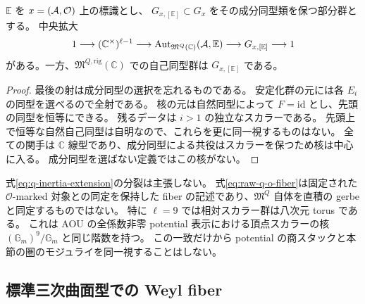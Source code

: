 \begin{proposition}[忘却に伴う慣性の核]\label{prop:q-marking-scalar-inertia}
$\mathbb E$ を $x=(\mathcal A,\mathcal O)$ 上の標識とし、
$G_{x,[\mathbb E]}\subset G_x$ をその成分同型類を保つ部分群とする。
中央拡大
\begin{equation}\label{eq:q-inertia-extension}
 1\longrightarrow (\mathbb C^\times)^{\ell-1}
 \longrightarrow\operatorname{Aut}_{\mathfrak M^Q(\mathbb C)}(\mathcal A,\mathbb E)
 \longrightarrow G_{x,[\mathbb E]}\longrightarrow1
\end{equation}
がある。一方、$\mathfrak M^{Q,\mathrm{rig}}(\mathbb C)$ での自己同型群は
$G_{x,[\mathbb E]}$ である。
\end{proposition}
\begin{proof}
最後の射は成分同型の選択を忘れるものである。
安定化群の元には各 $E_i$ の同型を選べるので全射である。
核の元は自然同型によって $F=\mathrm{id}$ とし、先頭の同型を恒等にできる。
残るデータは $i>1$ の独立なスカラーである。
先頭上で恒等な自然自己同型は自明なので、これらを更に同一視するものはない。
全ての関手は $\mathbb C$ 線型であり、成分同型による共役はスカラーを保つため核は中心に入る。
成分同型を選ばない定義ではこの核がない。
\end{proof}

式\eqref{eq:q-inertia-extension}の分裂は主張しない。
式\eqref{eq:raw-q-o-fiber}は固定された $\mathcal O$-marked 対象との同定を保持した
fiber の記述であり、$\mathfrak M^Q$ 自体を直積の gerbe と同定するものではない。
特に $\ell=9$ では相対スカラー群は八次元 torus である。
これは AOU の全係数非零 potential 表示における頂点スカラーの核
$(\mathbb G_m)^9/\mathbb G_m$ と同じ階数を持つ\cite[Lemma 5.2]{AOU}。
この一致だけから potential の商スタックと本節の圏のモジュライを同一視することはしない。

\subsection{標準三次曲面型での Weyl fiber}

